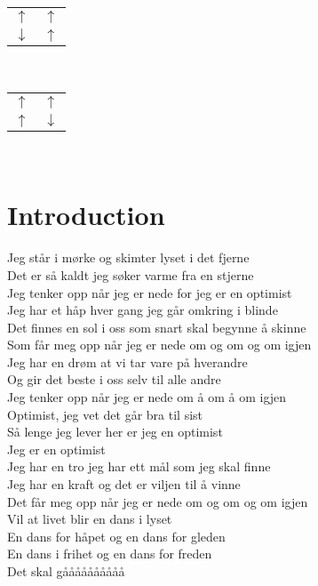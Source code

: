 \documentclass{article}
\begin{document}
\begin{tabular}{c c}
  $\uparrow$ & $\uparrow$\\
  $\downarrow$ & $\uparrow$
\end{tabular}\\

\begin{tabular}{c c}
  $\uparrow$ & $\uparrow$\\
  $\uparrow$ & $\downarrow$
\end{tabular}\\

\section*{Introduction}
Jeg står i mørke og skimter lyset i det fjerne\\
Det er så kaldt jeg søker varme fra en stjerne\\
Jeg tenker opp når jeg er nede for jeg er en optimist\\


Jeg har et håp hver gang jeg går omkring i blinde\\
Det finnes en sol i oss som snart skal begynne å skinne\\
Som får meg opp når jeg er nede om og om og om igjen\\

Jeg har en drøm at vi tar vare på hverandre\\
Og gir det beste i oss selv til alle andre\\
Jeg tenker opp når jeg er nede om å om å om igjen\\

Optimist, jeg vet det går bra til sist\\
Så lenge jeg lever her er jeg en optimist\\
Jeg er en optimist\\

Jeg har en tro jeg har ett mål som jeg skal finne\\
Jeg har en kraft og det er viljen til å vinne\\
Det får meg opp når jeg er nede om og om og om igjen\\

Vil at livet blir en dans i lyset\\
En dans for håpet og en dans for gleden\\
En dans i frihet og en dans for freden\\
Det skal gåååååååååå\\
\end{document}
